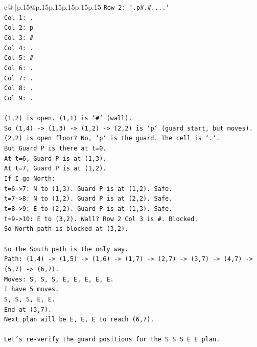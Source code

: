 \documentclass{article}
\begin{document}
{\begin{supertabular}{c@{$\;$}|p{.15\linewidth}@{}p{.15\linewidth}p{.15\linewidth}p{.15\linewidth}p{.15\linewidth}p{.15\linewidth}}
{{{\texttt{Row 2: `.p\#.\#....`} \\
\texttt{Col 1: .} \\
\texttt{Col 2: p} \\
\texttt{Col 3: \#} \\
\texttt{Col 4: .} \\
\texttt{Col 5: \#} \\
\texttt{Col 6: .} \\
\texttt{Col 7: .} \\
\texttt{Col 8: .} \\
\texttt{Col 9: .} \\
\\ 
\texttt{(1,2) is open. (1,1) is `\#` (wall).} \\
\texttt{So (1,4) {-}> (1,3) {-}> (1,2) {-}> (2,2) is `p` (guard start, but moves).} \\
\texttt{(2,2) is open floor? No, `p` is the guard. The cell is `.`.} \\
\texttt{But Guard P is there at t=0.} \\
\texttt{At t=6, Guard P is at (1,3).} \\
\texttt{At t=7, Guard P is at (1,2).} \\
\texttt{If I go North:} \\
\texttt{t=6{-}>7: N to (1,3). Guard P is at (1,2). Safe.} \\
\texttt{t=7{-}>8: N to (1,2). Guard P is at (2,2). Safe.} \\
\texttt{t=8{-}>9: E to (2,2). Guard P is at (1,3). Safe.} \\
\texttt{t=9{-}>10: E to (3,2). Wall? Row 2 Col 3 is \#. Blocked.} \\
\texttt{So North path is blocked at (3,2).} \\
\\ 
\texttt{So the South path is the only way.} \\
\texttt{Path: (1,4) {-}> (1,5) {-}> (1,6) {-}> (1,7) {-}> (2,7) {-}> (3,7) {-}> (4,7) {-}> (5,7) {-}> (6,7).} \\
\texttt{Moves: S, S, S, E, E, E, E, E.} \\
\texttt{I have 5 moves.} \\
\texttt{S, S, S, E, E.} \\
\texttt{End at (3,7).} \\
\texttt{Next plan will be E, E, E to reach (6,7).} \\
\\ 
\texttt{Let's re{-}verify the guard positions for the S S S E E plan.} \\
}}}
\end{supertabular}}
\end{document}
